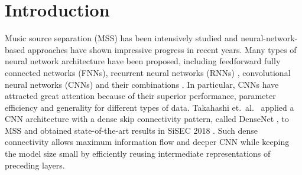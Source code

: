 \documentclass{article}
\begin{document}
\section{Introduction}
\label{sec:intro}
Music source separation (MSS) has been intensively studied and neural-network-based approaches have shown impressive progress in recent years. Many types of neural network architecture have been proposed, including feedforward fully connected networks (FNNs)\cite{Nugraha15, Uhlich15},  recurrent neural networks (RNNs) \cite{Uhlich17}, convolutional neural networks (CNNs) \cite{Takahashi17,Stoller18WavU,Takahashi18PhaseNet,defossez2019demucs,Samuel20,spleeter2019} and their combinations \cite{Takahashi18MMDenseLSTM,Liu19}.
In particular, CNNs have attracted great attention because of their superior performance, parameter efficiency and generality for different types of data. Takahashi et.~al.~\cite{Takahashi18MMDenseLSTM} applied a CNN architecture with a dense skip connectivity pattern, called DenseNet \cite{Huang17Densenet}, to MSS and obtained state-of-the-art results in SiSEC 2018 \cite{sisec2018}.  Such dense connectivity allows maximum information flow and deeper CNN while keeping the model size small by efficiently reusing intermediate representations of preceding layers.
\end{document}
